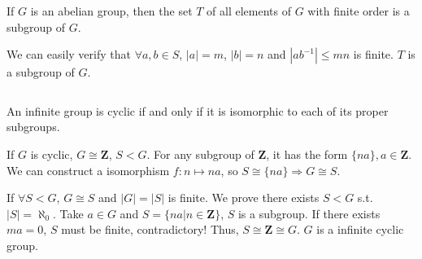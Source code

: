 $$ $$

\begin{ex}
    If $G$ is an abelian group, then the set $T$ of all elements of $G$ with finite order is a subgroup of $G$.
\end{ex}

\begin{answer}
    We can easily verify that $\forall a,b\in S$, $\left| a \right| =m$, $\left| b \right| =n$ and $\left| ab^{-1} \right| \leq mn$ is finite. $T$ is a subgroup of $G$.
\end{answer}

$$ $$

\begin{ex}
    An infinite group is cyclic if and only if it is isomorphic to each of its proper subgroups.
\end{ex}

\begin{answer}
    If $G$ is cyclic, $G\cong \mathbf{Z}$, $S<G$. For any subgroup of $\mathbf{Z}$, it has the form $\{na\}, a\in \mathbf{Z}$. We can construct a isomorphism $f:n\mapsto na$, so $S\cong \{na\}\Rightarrow G\cong S$.

    If $\forall S<G$, $G\cong S$ and $\left| G \right| =\left| S \right| $ is finite. We prove there exists $S<G$ s.t. $\left| S \right| =\aleph_{0}$. Take $a\in G$ and $S=\{na|n\in \mathbf{Z}\}$, $S$ is a subgroup. If there exists $ma=0$, $S$ must be finite, contradictory! Thus, $S\cong \mathbf{Z}\cong G$. $G$ is a infinite cyclic group.
\end{answer}